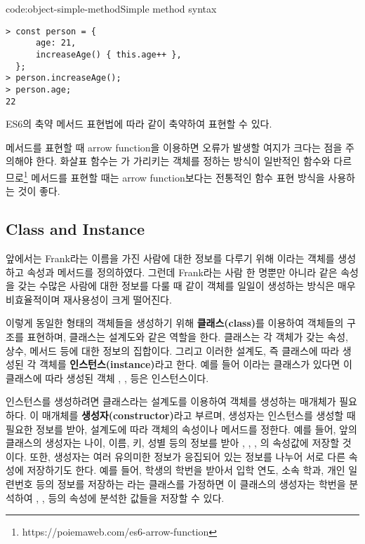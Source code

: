 \begin{codeenv}{code:object-simple-method}{Simple method syntax}\begin{verbatim}
> const person = {
      age: 21,
      increaseAge() { this.age++ },
  };
> person.increaseAge();
> person.age;
22
\end{verbatim}
\end{codeenv}

ES6의 축약 메서드 표현법에 따라 \와 같이 축약하여 표현할 수 있다.

메서드를 표현할 때 arrow function을 이용하면 오류가 발생할 여지가 크다는 점을 주의해야 한다. 화살표 함수는 가 가리키는 객체를 정하는 방식이 일반적인 함수와 다르므로\footnote{https://poiemaweb.com/es6-arrow-function} 메서드를 표현할 때는 arrow function보다는 전통적인 함수 표현 방식을 사용하는 것이 좋다.

\subsection*{Class and Instance}

앞에서는 Frank라는 이름을 가진 사람에 대한 정보를 다루기 위해 이라는 객체를 생성하고 속성과 메서드를 정의하였다. 그런데 Frank라는 사람 한 명뿐만 아니라 같은 속성을 갖는 수많은 사람에 대한 정보를 다룰 때 \와 같이 객체를 일일이 생성하는 방식은 매우 비효율적이며 재사용성이 크게 떨어진다.

이렇게 동일한 형태의 객체들을 생성하기 위해 \textbf{클래스(class)}를 이용하여 객체들의 구조를 표현하며, 클래스는 설계도와 같은 역할을 한다. 클래스는 각 객체가 갖는 속성, 상수, 메서드 등에 대한 정보의 집합이다. 그리고 이러한 설계도, 즉 클래스에 따라 생성된 각 객체를 \textbf{인스턴스(instance)}라고 한다. 예를 들어 이라는 클래스가 있다면 이 클래스에 따라 생성된 객체 , ,  등은 인스턴스이다.

인스턴스를 생성하려면 클래스라는 설계도를 이용하여 객체를 생성하는 매개체가 필요하다. 이 매개체를 \textbf{생성자(constructor)}라고 부르며, 생성자는 인스턴스를 생성할 때 필요한 정보를 받아, 설계도에 따라 객체의 속성이나 메서드를 정한다. 예를 들어, 앞의  클래스의 생성자는 나이, 이름, 키, 성별 등의 정보를 받아 , , , 의 속성값에 저장할 것이다. 또한, 생성자는 여러 유의미한 정보가 응집되어 있는 정보를 나누어 서로 다른 속성에 저장하기도 한다. 예를 들어, 학생의 학번을 받아서 입학 연도, 소속 학과, 개인 일련번호 등의 정보를 저장하는 라는 클래스를 가정하면 이 클래스의 생성자는 학번을 분석하여 , ,  등의 속성에 분석한 값들을 저장할 수 있다.

